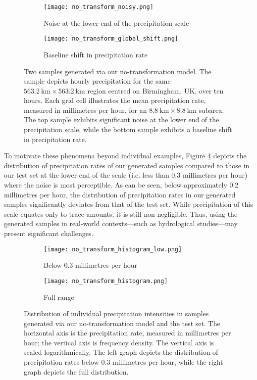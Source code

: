 \documentclass[ oneside,%
                    author={George Herbert},
                    degree={MSci},
                     title={Diffusion Models for Time-Evolving Precipitation Fields},
                  subtitle={}]{dissertation}
\begin{document}
\begin{figure}[htbp]
      \centering
      \begin{subfigure}{\textwidth}
            \texttt{[image: no\_transform\_noisy.png]}
            \caption{Noise at the lower end of the precipitation scale}
            \label{fig:no_transform_sample}
      \end{subfigure}
      \begin{subfigure}{\textwidth}
            \texttt{[image: no\_transform\_global\_shift.png]}
            \caption{Baseline shift in precipitation rate}
            \label{fig:no_transform_global_shift}
      \end{subfigure}
      \caption{Two samples generated via our no-transformation model. The sample depicts hourly precipitation for the same $563.2\ \mathrm{km} \times 563.2\ \mathrm{km}$ region centred on Birmingham, UK, over ten hours. Each grid cell illustrates the mean precipitation rate, measured in millimetres per hour, for an $8.8 \ \mathrm{km} \times 8.8\ \mathrm{km}$ subarea. The top sample exhibits significant noise at the lower end of the precipitation scale, while the bottom sample exhibits a baseline shift in precipitation rate.}
\end{figure}

To motivate these phenomena beyond individual examples, Figure \ref{fig:no_transform_histogram_low} depicts the distribution of precipitation rates of our generated samples compared to those in our test set at the lower end of the scale (i.e. less than 0.3 millimetres per hour) where the noise is most perceptible. As can be seen, below approximately 0.2 millimetres per hour, the distribution of precipitation rates in our generated samples significantly deviates from that of the test set. While precipitation of this scale equates only to trace amounts, it is still non-negligible. Thus, using the generated samples in real-world contexts---such as hydrological studies---may present significant challenges.

\begin{figure}[htbp]
      \centering
      \begin{subfigure}{0.49\textwidth}
            \texttt{[image: no\_transform\_histogram\_low.png]}
            \caption{Below 0.3 millimetres per hour}
            \label{fig:no_transform_histogram_low}
      \end{subfigure}
      \begin{subfigure}{0.49\textwidth}
            \texttt{[image: no\_transform\_histogram.png]}
            \caption{Full range}
            \label{fig:no_transform_histogram_high}
      \end{subfigure}
      \caption{Distribution of individual precipitation intensities in samples generated via our no-transformation model and the test set. The horizontal axis is the precipitation rate, measured in millimetres per hour; the vertical axis is frequency density. The vertical axis is scaled logarithmically. The left graph depicts the distribution of precipitation rates below 0.3 millimetres per hour, while the right graph depicts the full distribution.}
      \label{fig:no_transform_histogram}
\end{figure}
\end{document}
